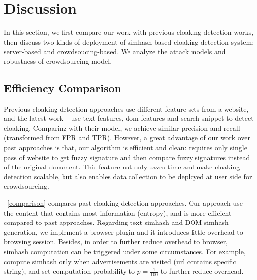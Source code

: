 \section{Discussion}
\label{s:discussion}

In this section, we first compare our work with previous cloaking detection
works, then discuss two kinds of deployment of simhash-based cloaking
detection system: server-based and crowdsoucing-based. We analyze the attack models
and robustness of crowdsourcing model.

\subsection{Efficiency Comparison}
\label{ss:efficiency}
Previous cloaking detection approaches use different feature sets from a website,
and the latest work ~\cite{wang2011cloak} use text features, dom features and
search snippet to detect cloaking. Comparing with their model, we achieve
similar precision and recall (transformed from FPR and TPR). However, a great
advantage of our work over past approaches is that, our algorithm is
efficient and clean: requires only single pass of website to get fuzzy signature and then
compare fuzzy signatures instead of the original document. This feature 
not only saves time and make cloaking detection scalable, 
but also enables data collection to be deployed at user side for crowdsourcing.

~\autoref{comparison} compares past cloaking detection approaches. Our approach
use the content that contains most information (entropy), and is more efficient
compared to past approaches. Regarding text simhash and DOM simhash generation,
we implement a browser plugin and it introduces little overhead to browsing
session. Besides, in order to further reduce overhead to browser, simhash
computation can be triggered under some circumstances. For example, compute
simhash only when advertisements are visited (url contains specific string), and
set computation probability to $p = \frac{1}{100}$ to further reduce overhead.


